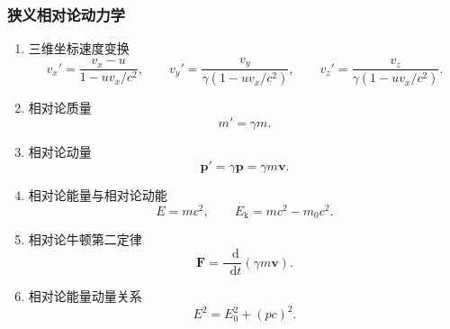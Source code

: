 \documentclass[UTF8,fontset=fandol,zihao=5]{ctexart}
\newcommand{\vect}[1]{\bm{#1}}
\newcommand{\dif}{\mathop{}\!\mathrm{d}}
\begin{document}
\subsubsection{狭义相对论动力学}

\begin{enumerate}
  \item 三维坐标速度变换
  \[
    v_x'=\frac{v_x-u}{1-uv_x/c^2},
    \qquad
    v_y'=\frac{v_y}{\gamma(1-uv_x/c^2)},
    \qquad
    v_z'=\frac{v_z}{\gamma(1-uv_x/c^2)}.
  \]

  \item 相对论质量
  \[
    m'=\gamma m.
  \]

  \item 相对论动量
  \[
    \vect p'=\gamma\vect p=\gamma m\vect v.
  \]

  \item 相对论能量与相对论动能
  \[
    E=mc^2,
    \qquad
    E_{\mathrm k}=mc^2-m_0c^2.
  \]

  \item 相对论牛顿第二定律
  \[
    \vect F=\frac{\dif}{\dif t}(\gamma m\vect v).
  \]

  \item 相对论能量动量关系
  \[
    E^2=E_0^2+(pc)^2.
  \]
\end{enumerate}
\end{document}
